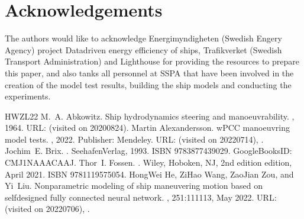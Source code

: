 \documentclass[review]{elsarticle}
\begin{document}
\section{Acknowledgements}
\label{\detokenize{acknowledgements:acknowledgements}}\label{\detokenize{acknowledgements::doc}}
\sphinxAtStartPar
The authors would like to acknowledge Energimyndigheten (Swedish Engery Agency) project Data\sphinxhyphen{}driven energy efficiency of ships, Trafikverket (Swedish Transport Administration) and Lighthouse for providing the resources to prepare this paper, and also tanks all personnel at SSPA that have been involved in the creation of the model test results, building the ship models and conducting the experiments.

\sphinxAtStartPar


\begin{sphinxthebibliography}{HWZL22}
\sphinxAtStartPar
M. A. Abkowitz. Ship hydrodynamics \sphinxhyphen{} steering and manoeuvrability. , 1964. URL:  (visited on 2020\sphinxhyphen{}08\sphinxhyphen{}24).
\sphinxAtStartPar
Martin Alexandersson. wPCC manoeuvring model tests. , 2022. Publisher: Mendeley. URL:  (visited on 2022\sphinxhyphen{}07\sphinxhyphen{}14), .
\sphinxAtStartPar
Jochim E. Brix. . Seehafen\sphinxhyphen{}Verlag, 1993. ISBN 978\sphinxhyphen{}3\sphinxhyphen{}87743\sphinxhyphen{}902\sphinxhyphen{}9. Google\sphinxhyphen{}Books\sphinxhyphen{}ID: CMJ1NAAACAAJ.
\sphinxAtStartPar
Thor I. Fossen. . Wiley, Hoboken, NJ, 2nd edition edition, April 2021. ISBN 978\sphinxhyphen{}1\sphinxhyphen{}119\sphinxhyphen{}57505\sphinxhyphen{}4.
\sphinxAtStartPar
Hong\sphinxhyphen{}Wei He, Zi\sphinxhyphen{}Hao Wang, Zao\sphinxhyphen{}Jian Zou, and Yi Liu. Nonparametric modeling of ship maneuvering motion based on self\sphinxhyphen{}designed fully connected neural network. , 251:111113, May 2022. URL:  (visited on 2022\sphinxhyphen{}07\sphinxhyphen{}06), .

\end{sphinxthebibliography}
\end{document}
